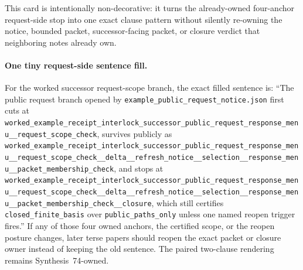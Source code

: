 \documentclass[11pt]{article}
\begin{document}
This card is intentionally non-decorative: it turns the already-owned four-anchor request-side stop into one exact clause pattern without silently re-owning the notice, bounded packet, successor-facing packet, or closure verdict that neighboring notes already own.\cite{series:workedexample}

\paragraph{One tiny request-side sentence fill.}
For the worked successor request-scope branch, the exact filled sentence is: ``The public request branch opened by \nolinkurl{example_public_request_notice.json} first cuts at \nolinkurl{worked_example_receipt_interlock_successor_public_request_response_menu__request_scope_check}, survives publicly as \nolinkurl{worked_example_receipt_interlock_successor_public_request_response_menu__request_scope_check__delta__refresh_notice__selection__response_menu__packet_membership_check}, and stops at \nolinkurl{worked_example_receipt_interlock_successor_public_request_response_menu__request_scope_check__delta__refresh_notice__selection__response_menu__packet_membership_check__closure}, which still certifies \nolinkurl{closed_finite_basis} over \nolinkurl{public_paths_only} unless one named reopen trigger fires.'' If any of those four owned anchors, the certified scope, or the reopen posture changes, later terse papers should reopen the exact packet or closure owner instead of keeping the old sentence. The paired two-clause rendering remains Synthesis~74-owned.\cite{series:workedexample}
\end{document}

